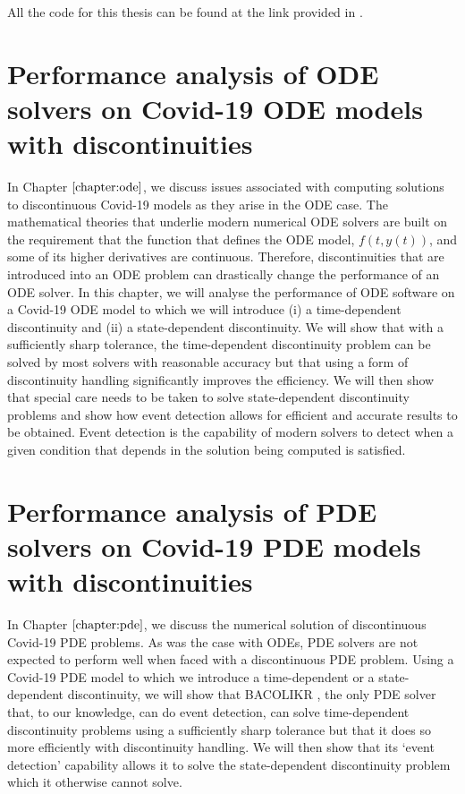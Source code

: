 \documentclass{report}
\begin{document}
All the code for this thesis can be found at the link provided in \cite{thisThesisGithub}.

\section{Performance analysis of ODE solvers on Covid-19 ODE models with discontinuities}
In Chapter $\ref{chapter:ode}$, we discuss issues associated with computing solutions to discontinuous Covid-19 models as they arise in the ODE case. The mathematical theories that underlie modern numerical ODE solvers are built on the requirement that the function that defines the ODE model, $f(t, y(t))$, and some of its higher derivatives are continuous. Therefore, discontinuities that are introduced into an ODE problem can drastically change the performance of an ODE solver. In this chapter, we will analyse the performance of ODE software on a Covid-19 ODE model to which we will introduce (i) a time-dependent discontinuity and (ii) a state-dependent discontinuity. We will show that with a sufficiently sharp tolerance, the time-dependent discontinuity problem can be solved by most solvers with reasonable accuracy but that using a form of discontinuity handling significantly improves the efficiency. We will then show that special care needs to be taken to solve state-dependent discontinuity problems and show how event detection allows for efficient and accurate results to be obtained. Event detection is the capability of modern solvers to detect when a given condition that depends in the solution being computed is satisfied. 

\section{Performance analysis of PDE solvers on Covid-19 PDE models with discontinuities}
In Chapter $\ref{chapter:pde}$, we discuss the numerical solution of discontinuous Covid-19 PDE problems. As was the case with ODEs, PDE solvers are not expected to perform well when faced with a discontinuous PDE problem. Using a Covid-19 PDE model to which we introduce a time-dependent or a state-dependent discontinuity, we will show that BACOLIKR \cite{bacolikr}, the only PDE solver that, to our knowledge, can do event detection, can solve time-dependent discontinuity problems using a sufficiently sharp tolerance but that it does so more efficiently with discontinuity handling. We will then show that its `event detection' capability allows it to solve the state-dependent discontinuity problem which it otherwise cannot solve.
\end{document}
